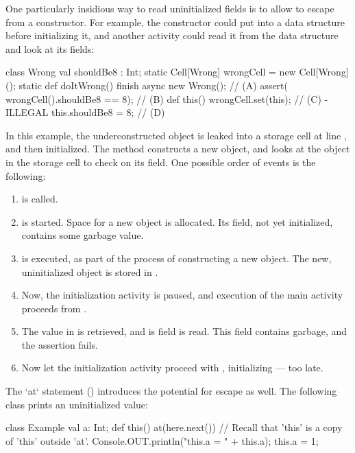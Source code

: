 One particularly insidious way to read uninitialized fields is to allow
 to escape from a constructor. For example, the constructor could
put  into a data structure before initializing it, and another
activity could read it from the data structure and look at its fields:
\begin{xten}
class Wrong {
  val shouldBe8 : Int;
  static Cell[Wrong] wrongCell = new Cell[Wrong]();
  static def doItWrong() {
     finish {
       async { new Wrong(); } // (A)
       assert( wrongCell().shouldBe8 == 8); // (B)
     }
  }
  def this() {
     wrongCell.set(this); // (C) - ILLEGAL
     this.shouldBe8 = 8; // (D)
  }
}
\end{xten}
\noindent
In this example, the underconstructed  object is leaked into a
storage cell at line , and then initialized.  The 
method constructs a new  object, and looks at the 
object in the storage cell to check on its  field.  One
possible order of events is the following:
\begin{enumerate}
\item {} is called.
\item {} is started.  Space for a new  object is allocated.
      Its  field, not yet initialized, contains some garbage
      value.
\item {} is executed, as part of the process of constructing a new
       object.  The new, uninitialized object is stored in
      .
\item Now, the initialization activity is paused, and execution of the main activity
      proceeds from .
\item The value in  is retrieved, and is  field
      is read.  This field contains garbage, and the assertion fails.
\item Now let the initialization activity proceed with ,
      initializing  --- too late.
\end{enumerate}

The \xcd`at` statement () introduces the potential for
escape as well. The following class prints an uninitialized value: 
\begin{xten}
class Example {
  val a: Int;
  def this() { 
    at(here.next()) {
      // Recall that 'this' is a copy of 'this' outside 'at'.
      Console.OUT.println("this.a = " + this.a);
    }
    this.a = 1;
  }
}
\end{xten}
%


